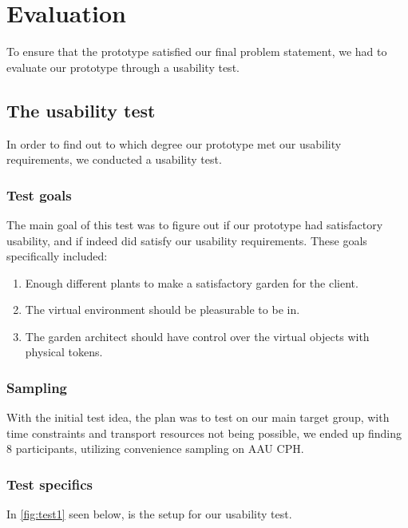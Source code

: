 \chapter{Evaluation}
To ensure that the prototype satisfied our final problem statement, we had to evaluate our prototype through a usability test. 

\section{The usability test}
In order to find out to which degree our prototype met our usability requirements, we conducted a usability test.

\subsection{Test goals}
The main goal of this test was to figure out if our prototype had satisfactory usability, and if indeed did satisfy our usability requirements. These goals specifically included:\\
\begin{enumerate}
	\item Enough different plants to make a satisfactory garden for the client.\\
	\item The virtual environment should be pleasurable to be in.\\
	\item The garden architect should have control over the virtual objects with physical tokens.\\
\end{enumerate}


\subsection{Sampling}
With the initial test idea, the plan was to test on our main target group, with time constraints and transport resources not being possible, we ended up finding 8 participants, utilizing convenience sampling on AAU CPH.

\subsection{Test specifics}
In \autoref{fig:test1} seen below, is the setup for our usability test.

